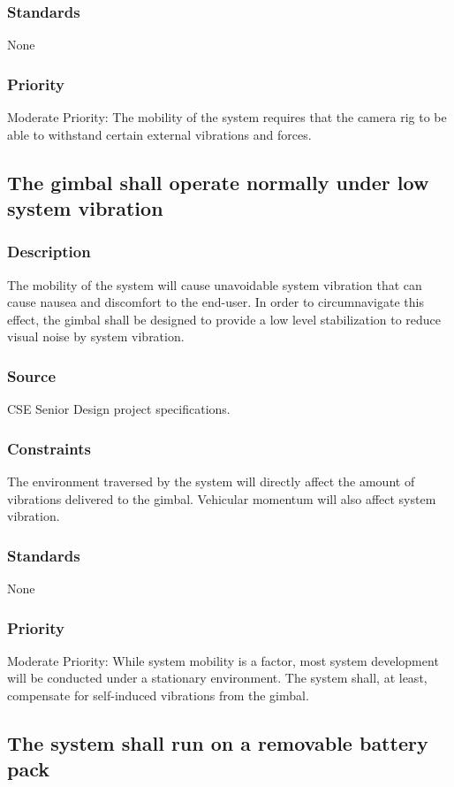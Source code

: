 \subsubsection{Standards}
None
\subsubsection{Priority}
Moderate Priority: The mobility of the system requires that the camera rig to be able to withstand certain external vibrations and forces. 

\subsection{The gimbal shall operate normally under low system vibration}
\subsubsection{Description}
The mobility of the system will cause unavoidable system vibration that can cause nausea and discomfort to the end-user. In order to circumnavigate this effect, the gimbal shall be designed to provide a low level stabilization to reduce visual noise by system vibration.
\subsubsection{Source}
CSE Senior Design project specifications.
\subsubsection{Constraints}
The environment traversed by the system will directly affect the amount of vibrations delivered to the gimbal. Vehicular momentum will also affect system vibration. 
\subsubsection{Standards}
None
\subsubsection{Priority}
Moderate Priority: While system mobility is a factor, most system development will be conducted under a stationary environment. The system shall, at least, compensate for self-induced vibrations from the gimbal.  

\subsection{The system shall run on a removable battery pack}
